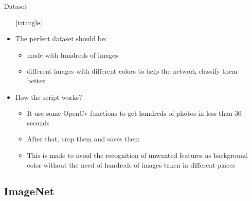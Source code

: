 \documentclass{beamer}
\begin{document}
\begin{frame}{Dataset}
	\begin{itemize}
		\setlength\itemsep{1em}
		[triangle]
		\item 
			The perfect dataset should be:
			\begin{itemize}
				[circle]
				\item 
					made with hundreds of images
				\item 
					different images with different colors to help the network classify them better
			\end{itemize}
		\item 
			How the script works?
			\begin{itemize}
				[circle]
				\item 
					It use some OpenCv functions to get hundreds of photos in less than 30 seconds
				\item 
					After that, crop them and saves them
				\item
					This is made to avoid the recognition of unwanted features as background color without 							the need of hundreds of images taken in different places
			\end{itemize}
	\end{itemize}
\end{frame}

\subsection{ImageNet}
\end{document}

